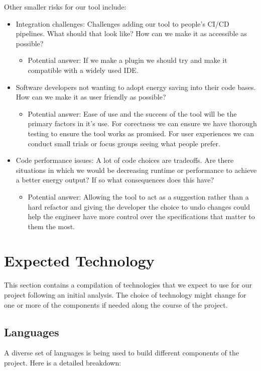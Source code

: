 \documentclass{article}
\begin{document}
Other smaller risks for our tool include:
\begin{itemize}
  \item Integration challenges: Challenges adding our tool to
    people's CI/CD pipelines. What should that look like? How can we
    make it as accessible as possible?
    \begin{itemize}
      \item Potential answer: If we make a plugin we should try and
        make it compatible with a widely used IDE.
    \end{itemize}
  \item Software developers not wanting to adopt energy saving into
    their code bases. How can we make it as user friendly as possible?
    \begin{itemize}
      \item Potential answer: Ease of use and the success of the tool
        will be the primary factors in it's use. For corectness we
        can ensure we have thorough testing to ensure the tool works
        as promised. For user experiences we can conduct small trials
        or focus groups seeing what people prefer.
    \end{itemize}
  \item Code performance issues: A lot of code choices are tradeoffs.
    Are there situations in which we would be decreasing runtime or
    performance to achieve a better energy output? If so what
    consequences does this have?
    \begin{itemize}
      \item Potential answer: Allowing the tool to act as a
        suggestion rather than a hard refactor and giving the
        developer the choice to undo changes could help the engineer
        have more control over the specifications that matter to them the most.
    \end{itemize}
\end{itemize}

\section{Expected Technology}

This section contains a compilation of technologies that we expect to
use for our project following an initial analysis. The choice of
technology might change for one or more of the components if needed
along the course of the project.

\subsection{Languages}
A diverse set of languages is being used to build different
components of the project. Here is a detailed breakdown:
\end{document}
